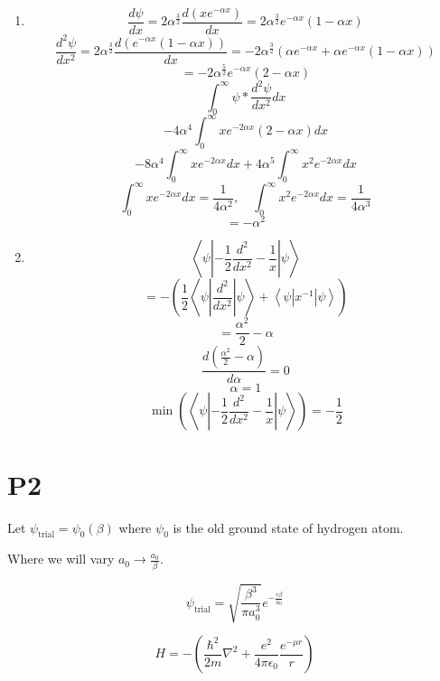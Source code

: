 \documentclass[12pt]{article}
\begin{document}
\begin{enumerate}
    \item
          \[
              \frac{d\psi}{dx} = 2\alpha^{\frac{3}{2}} \frac{d (x e^{-\alpha x})}{dx}
              = 2 \alpha^{\frac{3}{2}} e^{-\alpha x} (1 -\alpha x )
          \]
          \[
              \frac{d^2\psi}{dx^2} = 2 \alpha^{\frac{3}{2}} \frac{d(e^{-\alpha x} (1 -\alpha x ))}{dx}
              = -2 \alpha^{\frac{3}{2}}(\alpha e^{-\alpha x} + \alpha e^{-\alpha x} (1 -\alpha x ))
          \]
          \[
              = -2 \alpha^{\frac{5}{2}} e^{-\alpha x} (2 -\alpha x )
          \]
          \[
              \int_0^\infty \psi* \frac{d^2\psi}{dx^2}  dx
          \]
          \[
              -4 \alpha^4 \int_0^\infty x e^{-2\alpha x} (2 -\alpha x )  dx
          \]
          \[
              -8 \alpha^4 \int_0^\infty x e^{-2\alpha x}  dx + 4 \alpha^5 \int_0^\infty x^2 e^{-2\alpha x} dx
          \]
          \[
              \int_0^\infty x e^{-2\alpha x}  dx = \frac{1}{4\alpha^2}, \quad \int_0^\infty  x^2 e^{-2 \alpha x} dx = \frac{1}{4\alpha^3}
          \]
          \[
              = -\alpha^2
          \]
    \item \[
              \left\langle \psi \left| - \frac{1}{2}\frac{d^2}{dx^2} - \frac{1}{x} \right| \psi\right\rangle
          \]
          \[
              = - (\frac{1}{2}\left\langle \psi \left| \frac{d^2}{dx^2} \right| \psi\right\rangle + \left\langle \psi \left| x^{-1} \right| \psi\right\rangle)
          \]
          \[
              = \frac{\alpha^2}{2} - \alpha
          \]
          \[
              \frac{d (\frac{\alpha^2}{2} - \alpha)}{d \alpha} = 0
          \]
          \[
              \alpha = 1
          \]
          \[
              \min(\left\langle \psi \left| - \frac{1}{2}\frac{d^2}{dx^2} - \frac{1}{x} \right| \psi\right\rangle) = -\frac{1}{2}
          \]
\end{enumerate}

\newpage

\section{P2}

Let $\psi_\text{trial} = \psi_0(\beta)$ where $\psi_0$ is the old ground state of hydrogen atom.

Where we will vary $a_0 \rightarrow \frac{a_0}{\beta}$.

\[
    \psi_\text{trial} = \sqrt{\frac{\beta^3}{\pi a_0^3}} e^{-\frac{r \beta}{a_0}}
\]

\[
    H = - (\frac{\hbar^2}{2m} \nabla^2 + \frac{e^2}{4\pi \epsilon_0} \frac{e^{-\mu r}}{r})
\]
\end{document}
